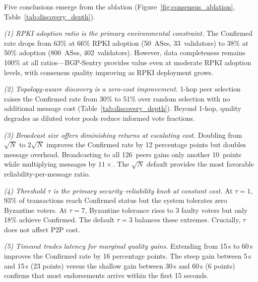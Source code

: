 Five conclusions emerge from the ablation (Figure~\ref{fig:consensus_ablation}, Table~\ref{tab:discovery_depth}).

\emph{(1) RPKI adoption ratio is the primary environmental constraint.} The Confirmed rate drops from 63\% at 66\% RPKI adoption (50~ASes, 33~validators) to 38\% at 50\% adoption (800~ASes, 402~validators). However, data completeness remains 100\% at all ratios---BGP-Sentry provides value even at moderate RPKI adoption levels, with consensus quality improving as RPKI deployment grows.

\emph{(2) Topology-aware discovery is a zero-cost improvement.} 1-hop peer selection raises the Confirmed rate from 30\% to 51\% over random selection with no additional message cost (Table~\ref{tab:discovery_depth}). Beyond 1-hop, quality degrades as diluted voter pools reduce informed vote fractions.

\emph{(3) Broadcast size offers diminishing returns at escalating cost.} Doubling from $\sqrt{N}$ to $2\sqrt{N}$ improves the Confirmed rate by 12 percentage points but doubles message overhead. Broadcasting to all 126~peers gains only another 10~points while multiplying messages by $11\times$. The $\sqrt{N}$ default provides the most favorable reliability-per-message ratio.

\emph{(4) Threshold $\tau$ is the primary security--reliability knob at constant cost.} At $\tau{=}1$, 93\% of transactions reach Confirmed status but the system tolerates zero Byzantine voters. At $\tau{=}7$, Byzantine tolerance rises to 3 faulty voters but only 18\% achieve Confirmed. The default $\tau{=}3$ balances these extremes. Crucially, $\tau$ does not affect P2P cost.

\emph{(5) Timeout trades latency for marginal quality gains.} Extending from 15\,s to 60\,s improves the Confirmed rate by 16 percentage points. The steep gain between 5\,s and 15\,s (23 points) versus the shallow gain between 30\,s and 60\,s (6 points) confirms that most endorsements arrive within the first 15 seconds.
